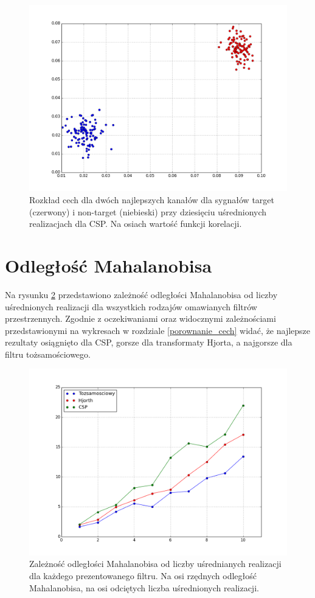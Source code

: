 \documentclass[licencjacka,openright]{pracamgr}
\begin{document}
\begin{figure}
\centering
\includegraphics[scale=0.55, trim=10mm 15mm 10mm 18mm, clip=True]{pics/cecha_csp_10.png}
\caption{Rozkład cech dla dwóch najlepszych kanałów dla sygnałów target (czerwony) i non-target (niebieski) przy dziesięciu uśrednionych realizacjach dla CSP. Na osiach wartość funkcji korelacji.}
\label{cecha_csp_10}
\end{figure}

\section{Odległość Mahalanobisa}
Na rysunku \ref{mahalanobis_pic} przedstawiono zależność odległości Mahalanobisa od liczby uśrednionych realizacji dla wszystkich rodzajów omawianych filtrów przestrzennych. Zgodnie z oczekiwaniami oraz widocznymi zależnościami przedstawionymi na wykresach w rozdziale \ref{porownanie_cech} widać, że najlepsze rezultaty osiągnięto dla CSP, gorsze dla transformaty Hjorta, a najgorsze dla filtru tożsamościowego. 

\begin{figure}
\centering
\includegraphics[scale=0.6, trim=10mm 15mm 10mm 18mm, clip=True]{pics/mahalanobis.png}
\caption{Zależność odległości Mahalanobisa od liczby uśrednianych realizacji dla każdego prezentowanego filtru. Na osi rzędnych odległość Mahalanobisa, na osi odciętych liczba uśrednionych realizacji.}
\label{mahalanobis_pic}
\end{figure}
\end{document}
